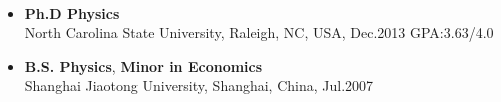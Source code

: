 \documentclass[11pt]{article} %
\begin{document}
\vspace{0mm}

 
 \\
\vspace{-5mm}

\begin{itemize}
  \item {\bf Ph.D Physics} \hspace{100mm}   \\
    North Carolina State University, Raleigh, NC, USA, Dec.2013     GPA:3.63/4.0\\
\vspace{-4mm}
  \item {\bf B.S. Physics}, {\bf Minor in Economics}\\
    Shanghai Jiaotong University, Shanghai, China, Jul.2007\\
\vspace{-6mm}
\end{itemize}

\vspace{-7mm}  
\end{document}
